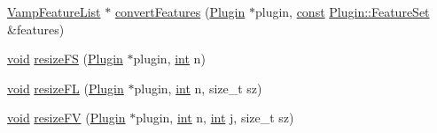 \begin{DoxyCompactItemize}
\item 
\hyperlink{vamp_8h_a5f257e3f8b5ca1ca4c159d486e219078}{Vamp\+Feature\+List} $\ast$ \hyperlink{class_vamp_1_1_plugin_adapter_base_1_1_impl_a550b4522bfbf1ad23297be28c51a4d72}{convert\+Features} (\hyperlink{class_vamp_1_1_plugin}{Plugin} $\ast$plugin, \hyperlink{getopt1_8c_a2c212835823e3c54a8ab6d95c652660e}{const} \hyperlink{class_vamp_1_1_plugin_a448fb57dc245d47923ec9eeaf9856c5f}{Plugin\+::\+Feature\+Set} \&features)
\item 
\hyperlink{sound_8c_ae35f5844602719cf66324f4de2a658b3}{void} \hyperlink{class_vamp_1_1_plugin_adapter_base_1_1_impl_a429c029c0068230d1afa97426b04ce0d}{resize\+FS} (\hyperlink{class_vamp_1_1_plugin}{Plugin} $\ast$plugin, \hyperlink{xmltok_8h_a5a0d4a5641ce434f1d23533f2b2e6653}{int} n)
\item 
\hyperlink{sound_8c_ae35f5844602719cf66324f4de2a658b3}{void} \hyperlink{class_vamp_1_1_plugin_adapter_base_1_1_impl_af5fcc5331f2dfa4c650eee636af72403}{resize\+FL} (\hyperlink{class_vamp_1_1_plugin}{Plugin} $\ast$plugin, \hyperlink{xmltok_8h_a5a0d4a5641ce434f1d23533f2b2e6653}{int} n, size\+\_\+t sz)
\item 
\hyperlink{sound_8c_ae35f5844602719cf66324f4de2a658b3}{void} \hyperlink{class_vamp_1_1_plugin_adapter_base_1_1_impl_a9b0791b97e91f8b8c3d18f3ed3bed861}{resize\+FV} (\hyperlink{class_vamp_1_1_plugin}{Plugin} $\ast$plugin, \hyperlink{xmltok_8h_a5a0d4a5641ce434f1d23533f2b2e6653}{int} n, \hyperlink{xmltok_8h_a5a0d4a5641ce434f1d23533f2b2e6653}{int} j, size\+\_\+t sz)
\end{DoxyCompactItemize}
